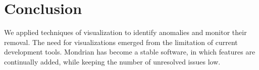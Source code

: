 \documentclass[runningheads]{llncs}
\newcommand{\seclabel}[1]{\label{sec:#1}}
\begin{document}
%
%
%

%



%


\section{Conclusion} \seclabel{conclusion}


We applied techniques of visualization to identify anomalies and monitor their removal. 
The need for visualizations emerged from the limitation of current development tools. 
Mondrian has become a stable software, in which features are continually added, while keeping the number of unresolved issues low.




{\small


}
\end{document}
